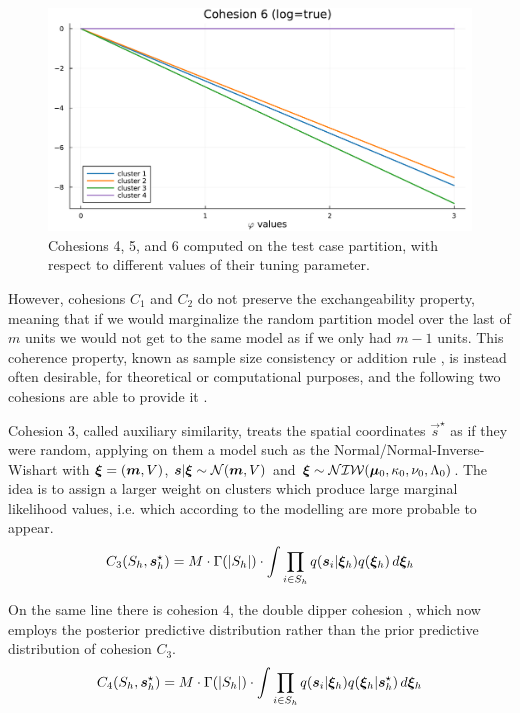 \documentclass[12pt,	%
	a4paper,		%
	twoside,		%
	openright,		%
	titlepage,%
	]{book}
\theoremstyle{definition}
\begin{document}
\begin{figure}[!p]
    \includegraphics[width=1\linewidth]{model description/spatial cohesion analysis/cohesion6.pdf}
    \caption[Cohesions 4, 5, and 6 illustration]{Cohesions 4, 5, and 6 computed on the test case partition, with respect to different values of their tuning parameter.}
    \label{fig: cohesions 456}
\end{figure}

However, cohesions $C_1$ and $C_2$ do not preserve the exchangeability property, meaning that if we would marginalize the random partition model over the last of $m$ units we would not get to the same model as if we only had $m-1$ units. This coherence property, known as sample size consistency or addition rule \cite{sample-size-consistency}, is instead often desirable, for theoretical or computational purposes, and the following two cohesions are able to provide it \cite{paper2}.

Cohesion 3, called auxiliary similarity, treats the spatial coordinates $\vec{s}^\star$ as if they were random, applying on them a model such as the Normal/Normal-Inverse-Wishart with $\boldsymbol{\xi} = (\boldsymbol{m},V)$, $\boldsymbol{s}|\boldsymbol{\xi} \sim \mathcal{N}(\boldsymbol{m},V)$ and $\boldsymbol{\xi} \sim \mathcal{NIW}( \boldsymbol{\mu}_0,\kappa_0, \nu_0, \Lambda_0)$. The idea is to assign a larger weight on clusters which produce large marginal likelihood values, i.e. which according to the modelling are more probable to appear.
\begin{equation}    
C_3(S_{h},\boldsymbol{s}_{h}^\star) = M \cdot \Gamma(|S_h|) \cdot \int \prod_{i \in S_h} q(\boldsymbol{s}_i|\boldsymbol{\xi}_h) q(\boldsymbol{\xi}_h) \, d\boldsymbol{\xi}_h
\end{equation}

On the same line there is cohesion 4, the double dipper cohesion \cite{double-dipper}, which now employs the posterior predictive distribution rather than the prior predictive distribution of cohesion $C_3$. 
\begin{equation}    
C_4(S_{h},\boldsymbol{s}_{h}^\star) = M \cdot \Gamma(|S_h|) \cdot \int \prod_{i \in S_h} q(\boldsymbol{s}_i|\boldsymbol{\xi}_h) q(\boldsymbol{\xi}_h|\boldsymbol{s}_h^\star) \, d\boldsymbol{\xi}_h
\end{equation}
\end{document}
